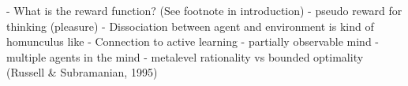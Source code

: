 \label{conclusion}


- What is the reward function? (See footnote in introduction)
- pseudo reward for thinking (pleasure)
- Dissociation between agent and environment is kind of homunculus like
- Connection to active learning
- partially observable mind
- multiple agents in the mind
- metalevel rationality vs bounded optimality (Russell \& Subramanian, 1995)